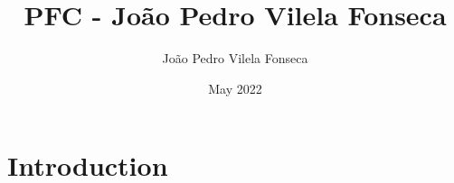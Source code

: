 \documentclass{article}
\title{PFC - João Pedro Vilela Fonseca}
\author{João Pedro Vilela Fonseca}
\date{May 2022}
\begin{document}
\maketitle

\section{Introduction}
\end{document}
